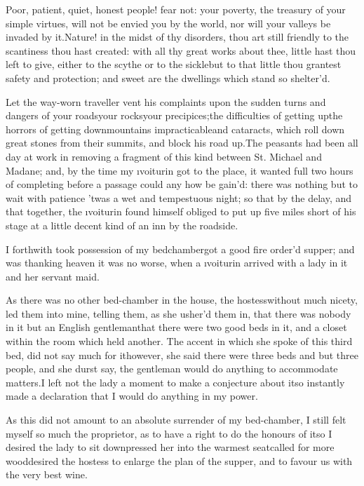 \documentclass[twoside]{article}
\begin{document}
Poor, patient, quiet, honest people! fear
not: your poverty, the treasury of your
simple virtues, will not be envied you by
the world, nor will your valleys be
invaded by it.\tskk Nature! in the midst
of thy disorders, thou art still friendly
to the scantiness thou hast created: with
all thy great works about thee, little
hast thou left to give, either to the
scythe or to the sickle\tskk but to that
little thou grantest safety and
protection; and sweet are the dwellings
which stand so shelter’d.

Let the way-worn traveller vent his
complaints upon the sudden turns and
dangers of your roads\tskk your
rocks\tskk your precipices;\tskk the
difficulties of getting up\tskk the
horrors of getting down\tskk mountains
impracticable\tskk and cataracts, which
roll down great stones from their summits,
and block his road up.\tskk The peasants
had been all day at work in removing a
fragment of this kind between St. Michael
and Madane; and, by the time my
\i{voiturin} got to the place, it wanted
full two hours of completing before a
passage could any how be gain’d: there was
nothing but to wait with patience\tskk
’twas a wet and tempestuous night; so that
by the delay, and that together, the
\i{voiturin} found himself obliged to put
up five miles short of his stage at a
little decent kind of an inn by the
roadside.

I forthwith took possession of my
bedchamber\tskk got a good fire\tskk
order’d supper; and was thanking heaven it
was no worse, when a \i{voiturin} arrived
with a lady in it and her servant maid.

As there was no other bed-chamber in the
house, the hostess\tskk without much
nicety, led them into mine, telling them,
as she usher’d them in, that there was
nobody in it but an English
gentleman\tskk that there were two good
beds in it, and a closet within the room
which held another.  The accent in which
she spoke of this third bed, did not say
much for it\tskk however, she said there
were three beds and but three people, and
she durst say, the gentleman would do
anything to accommodate matters.\tskk I
left not the lady a moment to make a
conjecture about it\tskk so instantly made
a declaration that I would do anything in
my power.

As this did not amount to an absolute
surrender of my bed-chamber, I still felt
myself so much the proprietor, as to have
a right to do the honours of it\tskk so I
desired the lady to sit down\tskk pressed
her into the warmest seat\tskk called for
more wood\tskk desired the hostess to
enlarge the plan of the supper, and to
favour us with the very best wine.
\end{document}

